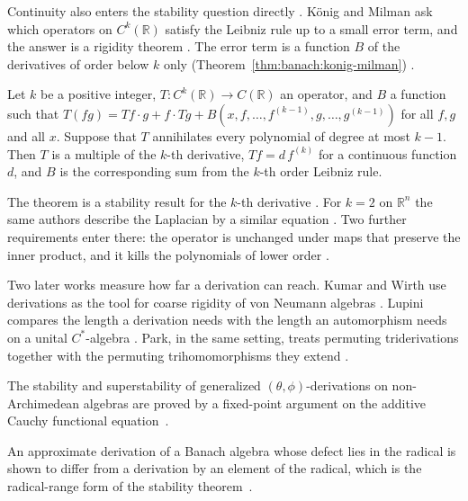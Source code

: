 Continuity also enters the stability question directly
\cite[p.~405]{KonigMilman2014Derivation}. K\"onig and Milman
ask which operators on $C^k(\mathbb{R})$ satisfy the Leibniz rule up to a
small error term, and the answer is a rigidity theorem
\cite[p.~405]{KonigMilman2014Derivation}. The error term is a function $B$ of
the derivatives of order below $k$ only (Theorem~\ref{thm:banach:konig-milman})
\cite[p.~407]{KonigMilman2014Derivation}.\begin{theorem}\label{thm:banach:konig-milman}
Let $k$ be a positive integer, $T\colon C^k(\mathbb{R})\to C(\mathbb{R})$ an
operator, and $B$ a function such that
$T(fg)=Tf\cdot g+f\cdot Tg+B(x,f,\dots,f^{(k-1)},g,\dots,g^{(k-1)})$ for all
$f,g$ and all $x$. Suppose that $T$ annihilates every polynomial of degree at
most $k-1$. Then $T$ is a multiple of the $k$-th derivative, $Tf=d\,f^{(k)}$
for a continuous function $d$, and $B$ is the corresponding sum from the
$k$-th order Leibniz rule.
\end{theorem}

The theorem is a stability result for the $k$-th derivative
\cite[p.~407]{KonigMilman2014Derivation}. For $k=2$ on $\mathbb{R}^n$ the same authors describe the Laplacian by a
similar equation \cite[p.~405]{KonigMilman2014Derivation}. Two further requirements enter there: the operator is unchanged under maps
that preserve the inner product, and it kills the polynomials of lower order
\cite[p.~405]{KonigMilman2014Derivation}.

Two later works measure how far a derivation can reach. Kumar and Wirth use
derivations as the tool for coarse rigidity of von Neumann algebras
\cite[Abstract, p.~1]{KumarWirth2026}. Lupini compares the length a derivation
needs with the length an automorphism needs on a unital $C^{*}$-algebra
\cite[Abstract, p.~1]{Lupini2026Length}. Park, in the same setting, treats
permuting triderivations together with the permuting trihomomorphisms they
extend \cite[Abstract, p.~1]{Park2020Trideriv}.

The stability and superstability of generalized $(\theta,\phi)$-derivations on non-Archimedean algebras are proved by a fixed-point argument on the additive Cauchy functional equation~\cite{WlStabilityAndSuperstability2019}.

An approximate derivation of a Banach algebra whose defect lies in the radical is shown to differ from a derivation by an element of the radical, which is the radical-range form of the stability theorem~\cite{WlApproximateDerivationsWithTheR2015}.

